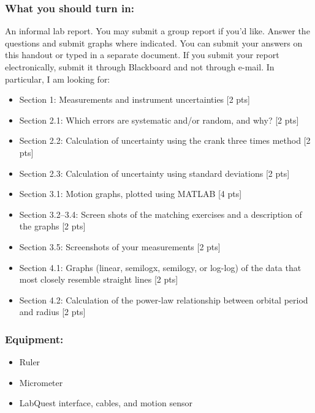 \documentclass[11pt,letterpaper]{article}
\newcounter{question}[section]
\begin{document}
\subsubsection*{What you should turn in:}
An informal lab report. You may submit a group report if you'd like. Answer the questions and submit graphs where indicated. You can submit your answers on this handout or typed in a separate document. If you submit your report electronically, submit it through Blackboard and not through e-mail. In particular, I am looking for: 
\begin{itemize}
\setlength{\parskip}{3pt}
\item Section 1: Measurements and instrument uncertainties [2 pts]
\item Section 2.1: Which errors are systematic and/or random, and why? [2 pts]
\item Section 2.2: Calculation of uncertainty using the crank three times method [2 pts]
\item Section 2.3: Calculation of uncertainty using standard deviations [2 pts]
\item Section 3.1: Motion graphs, plotted using MATLAB [4 pts]
\item Section 3.2--3.4: Screen shots of the matching exercises and a description of the graphs [2 pts]
\item Section 3.5: Screenshots of your measurements [2 pts]
\item Section 4.1: Graphs (linear, semilogx, semilogy, or log-log) of the data that most closely resemble straight lines [2 pts]
\item Section 4.2: Calculation of the power-law relationship between orbital period and radius [2 pts]
\end{itemize}

\subsubsection*{Equipment:}
\begin{itemize}
\setlength{\parskip}{3pt}
\item Ruler
\item Micrometer
\item LabQuest interface, cables, and motion sensor
\end{itemize}
\end{document}
